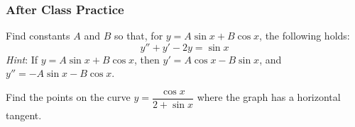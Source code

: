 \documentclass[notes]{subfiles}
\begin{document}
	\subsubsection*{After Class Practice}
		\begin{ex}
			Find constants \(A\) and \(B\) so that, for \(y = A\sin x + B\cos x\), the following holds:
				\[y'' + y' - 2y = \sin x\]
			\emph{Hint}: If \(y = A\sin x + B\cos x\), then \(y' = A\cos x - B\sin x\), and \(y'' = -A\sin x - B\cos x\).  
		\end{ex}
			
		\begin{ex}
			Find the points on the curve \(y = \dfrac{\cos x}{2 + \sin x}\) where the graph has a horizontal tangent.
		\end{ex}

\clearpage
\end{document}
